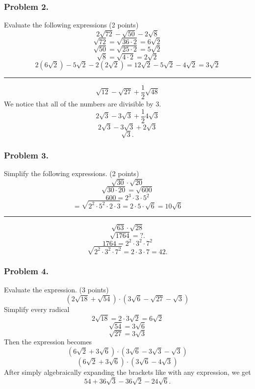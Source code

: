 \documentclass{article}
\begin{document}
\subsubsection{Problem 2.}
Evaluate the following expressions (2 points)
\[
2\sqrt{72} - \sqrt{50} - 2\sqrt{8}
\]
\[
\sqrt{72} = \sqrt{36 \cdot 2} = 6\sqrt{2}
\]
\[
\sqrt{50} = \sqrt{25 \cdot 2} = 5\sqrt{2}
\]
\[
\sqrt{8} = \sqrt{4 \cdot 2} = 2\sqrt{2}
\]
\[
2(6\sqrt{2}) - 5\sqrt{2} - 2(2\sqrt{2}) = 12\sqrt{2} - 5\sqrt{2} - 4\sqrt{2} = 3\sqrt{2}
\]

\vspace{3pt}
\hrule
\vspace{8pt}

\[
\sqrt{12} - \sqrt{27} + \frac{1}{2}\sqrt{48}
\]
We notice that all of the numbers are divisible by 3.
\[
2\sqrt{3}  - 3\sqrt{3} + \frac{1}{2}4\sqrt{3}
\]
\[
2\sqrt{3} - 3\sqrt{3} + 2\sqrt{3}
\]
\[
\sqrt{3}.
\]

\subsubsection{Problem 3.}
Simplify the following expressions. (2 points)
\[
\sqrt{30}\cdot\sqrt{20}
\]
\[
\sqrt{30 \cdot 20} = \sqrt{600}
\]
\[
600 = 2^3 \cdot 3 \cdot 5^2
\]
\[
=\sqrt{2^2 \cdot 5^2 \cdot 2 \cdot 3} = 2 \cdot 5 \cdot \sqrt{6} = 10\sqrt{6}
\]

\vspace{3pt}
\hrule
\vspace{8pt}

\[
\sqrt{63}\cdot\sqrt{28}
\]
\[
\sqrt{1764} = ?.
\]
\[
1764 = 2^2\cdot3^2\cdot7^2
\]
\[
\sqrt{2^2\cdot3^2\cdot7^2} = 2\cdot3\cdot7 = 42.
\]

\subsubsection{Problem 4.}
Evaluate the expression. (3 points)
\[
(2\sqrt{18} + \sqrt{54})\cdot(3\sqrt{6}-\sqrt{27}-\sqrt{3})
\]
Simplify every radical
\[
2\sqrt{18} = 2\cdot3\sqrt{2}=6\sqrt{2}
\]
\[
\sqrt{54} = 3\sqrt{6}
\]
\[
\sqrt{27} = 3\sqrt{3}
\]
Then the expression becomes
\[
(6\sqrt{2} + 3\sqrt{6}) \cdot (3\sqrt{6} - 3\sqrt{3} - \sqrt{3})
\]
\[
(6\sqrt{2} + 3\sqrt{6}) \cdot (3\sqrt{6} - 4\sqrt{3})
\]
After simply algebraically expanding the brackets like with any expression, we get
\[
54 + 36\sqrt{3} - 36\sqrt{2} - 24\sqrt{6}.
\]
\end{document}
